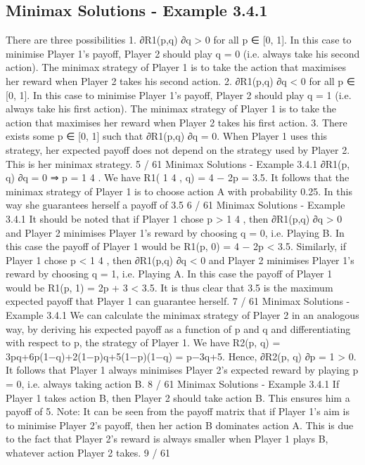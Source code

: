 \documentclass[]{report}
\begin{document}
\subsection{Minimax Solutions - Example 3.4.1}
There are three possibilities
1. ∂R1(p,q)
∂q > 0 for all p ∈ [0, 1]. In this case to minimise
Player 1’s payoff, Player 2 should play q = 0 (i.e.
always take his second action). The minimax strategy
of Player 1 is to take the action that maximises her
reward when Player 2 takes his second action.
2. ∂R1(p,q)
∂q < 0 for all p ∈ [0, 1]. In this case to minimise
Player 1’s payoff, Player 2 should play q = 1 (i.e.
always take his first action). The minimax strategy of
Player 1 is to take the action that maximises her
reward when Player 2 takes his first action.
3. There exists some p ∈ [0, 1] such that ∂R1(p,q)
∂q = 0.
When Player 1 uses this strategy, her expected payoff
does not depend on the strategy used by Player 2.
This is her minimax strategy.
5 / 61
Minimax Solutions - Example 3.4.1
∂R1(p, q)
∂q
= 0 ⇒ p =
1
4
.
We have
R1(
1
4
, q) = 4 − 2p = 3.5.
It follows that the minimax strategy of Player 1 is to choose action
A with probability 0.25. In this way she guarantees herself a payoff
of 3.5
6 / 61
Minimax Solutions - Example 3.4.1
It should be noted that if Player 1 chose p >
1
4
, then ∂R1(p,q)
∂q > 0
and Player 2 minimises Player 1’s reward by choosing q = 0, i.e.
Playing B.
In this case the payoff of Player 1 would be
R1(p, 0) = 4 − 2p < 3.5.
Similarly, if Player 1 chose p <
1
4
, then ∂R1(p,q)
∂q < 0 and Player 2
minimises Player 1’s reward by choosing q = 1, i.e. Playing A.
In this case the payoff of Player 1 would be
R1(p, 1) = 2p + 3 < 3.5. It is thus clear that 3.5 is the maximum
expected payoff that Player 1 can guarantee herself.
7 / 61
Minimax Solutions - Example 3.4.1
We can calculate the minimax strategy of Player 2 in an analogous
way, by deriving his expected payoff as a function of p and q and
differentiating with respect to p, the strategy of Player 1. We have
R2(p, q) = 3pq+6p(1−q)+2(1−p)q+5(1−p)(1−q) = p−3q+5.
Hence,
∂R2(p, q)
∂p
= 1 > 0.
It follows that Player 1 always minimises Player 2’s expected
reward by playing p = 0, i.e. always taking action B.
8 / 61
Minimax Solutions - Example 3.4.1
If Player 1 takes action B, then Player 2 should take action B.
This ensures him a payoff of 5.
Note: It can be seen from the payoff matrix that if Player 1’s aim
is to minimise Player 2’s payoff, then her action B dominates
action A.
This is due to the fact that Player 2’s reward is always smaller
when Player 1 plays B, whatever action Player 2 takes.
9 / 61
\end{document}
